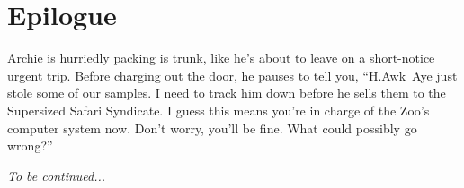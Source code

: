 \section*{Epilogue}

Archie is hurriedly packing is trunk, like he's about to leave on a
short-notice urgent trip. Before charging out the door, he pauses to tell you,
``H.Awk~Aye just stole some of our samples. I need to track him down before he
sells them to the Supersized Safari Syndicate. I guess this means you're in
charge of the Zoo's computer system now. Don't worry, you'll be fine. What
could possibly go wrong?''

\textit{To be continued...}


